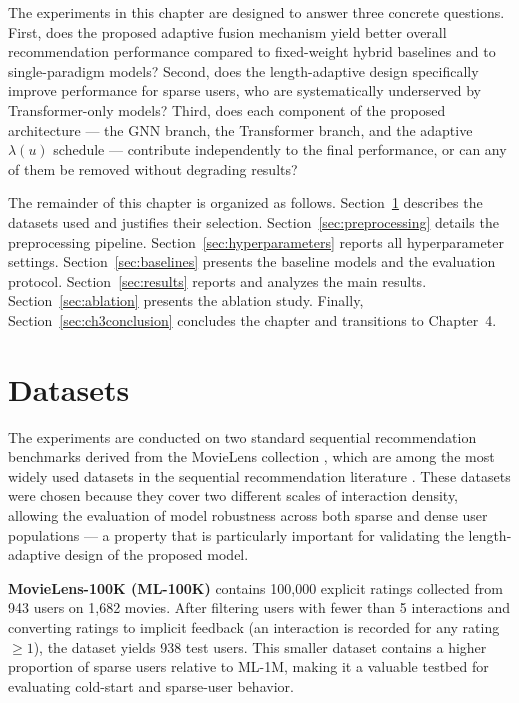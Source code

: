 \documentclass[12pt,a4paper]{report}
\begin{document}
The experiments in this chapter are designed to answer three concrete
questions. First, does the proposed adaptive fusion mechanism yield better
overall recommendation performance compared to fixed-weight hybrid baselines
and to single-paradigm models? Second, does the length-adaptive design
specifically improve performance for sparse users, who are systematically
underserved by Transformer-only models? Third, does each component of the
proposed architecture --- the GNN branch, the Transformer branch, and the
adaptive \(\lambda(u)\) schedule --- contribute independently to the final
performance, or can any of them be removed without degrading results?

The remainder of this chapter is organized as follows.
Section~\ref{sec:datasets} describes the datasets used and justifies their
selection. Section~\ref{sec:preprocessing} details the preprocessing pipeline.
Section~\ref{sec:hyperparameters} reports all hyperparameter settings.
Section~\ref{sec:baselines} presents the baseline models and the evaluation
protocol. Section~\ref{sec:results} reports and analyzes the main results.
Section~\ref{sec:ablation} presents the ablation study. Finally,
Section~\ref{sec:ch3conclusion} concludes the chapter and transitions to
Chapter~4.

\section{Datasets}
\label{sec:datasets}

The experiments are conducted on two standard sequential recommendation
benchmarks derived from the MovieLens collection \citep{harper2015movielens},
which are among the most widely used datasets in the sequential recommendation
literature \citep{pan2024survey, kang2018sasrec, sun2019bert4rec}. These
datasets were chosen because they cover two different scales of interaction
density, allowing the evaluation of model robustness across both sparse and
dense user populations — a property that is particularly important for
validating the length-adaptive design of the proposed model.

\textbf{MovieLens-100K (ML-100K)} contains 100,000 explicit ratings collected
from 943 users on 1,682 movies. After filtering users with fewer than 5
interactions and converting ratings to implicit feedback (an interaction is
recorded for any rating \(\geq 1\)), the dataset yields 938 test users. This
smaller dataset contains a higher proportion of sparse users relative to
ML-1M, making it a valuable testbed for evaluating cold-start and sparse-user
behavior.
\end{document}
